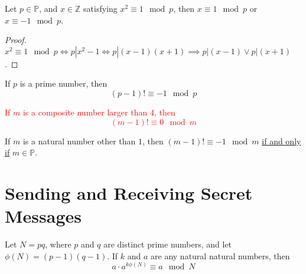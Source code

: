 \documentclass[11pt]{article}
\begin{document}
		\begin{theorem}[5.1.7]
			Let $p \in \mathbb{P}$, and $x \in \mathbb{Z}$ satisfying $x^2 \equiv 1 \mod p$, then $x \equiv 1 \mod p$ or $x \equiv -1 \mod p$.
		\end{theorem}
		\begin{proof}
			$x^2 \equiv 1 \mod p \iff p|x^2-1 \iff p|(x-1)(x+1) \implies p|(x-1) \lor p | (x+1)$.
		\end{proof}
		
		\begin{theorem}
			If $p$ is a prime number, then
			\[
				(p-1)! \equiv -1 \mod p
			\]
		\end{theorem}
		
		\textcolor{red}{
		\begin{theorem}[5.2.2]
			If $m$ is a composite number larger than $4$, then
			\[
				(m-1)! \equiv 0 \mod m
			\]
		\end{theorem}}
		
		\begin{theorem}
			If $m$ is a natural number other than $1$, then $(m-1)! \equiv -1 \mod m$ \ul{if and only if} $m \in \mathbb{P}$.
		\end{theorem}
	
	\section{Sending and Receiving Secret Messages}
		\begin{theorem}[6.1.2]
			Let $N=pq$, where $p$ and $q$ are distinct prime numbers, and let $\phi(N) = (p-1)(q-1)$. If $k$ and $a$ are any natural natural numbers, then 
			\[
				a \cdot a^{k \phi(N)} \equiv a \mod N
			\]
		\end{theorem}
		
\end{document}
